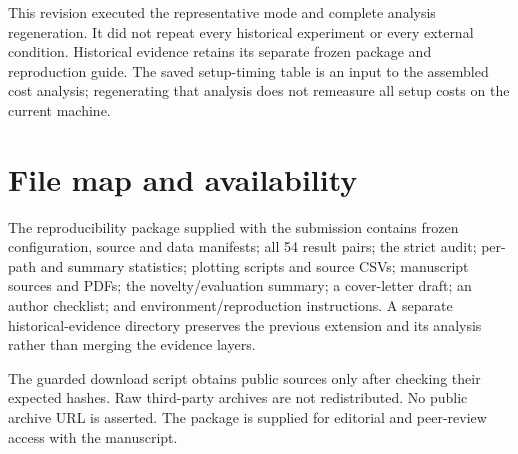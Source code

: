 \documentclass[smallextended]{svjour3}
\begin{document}
This revision executed the representative mode and complete analysis regeneration.
It did not repeat every historical experiment or every external condition.
Historical evidence retains its separate frozen package and reproduction guide.
The saved setup-timing table is an input to the assembled cost analysis; regenerating
that analysis does not remeasure all setup costs on the current machine.

\section{File map and availability}
The reproducibility package supplied with the submission contains frozen configuration, source and data manifests;
all 54 result pairs; the strict audit; per-path and summary statistics; plotting
scripts and source CSVs; manuscript sources and PDFs; the novelty/evaluation
summary; a cover-letter draft; an author checklist; and environment/reproduction
instructions. A separate historical-evidence directory preserves the previous
extension and its analysis rather than merging the evidence layers.

The guarded download script obtains public sources only after checking their
expected hashes. Raw third-party archives are not redistributed. No public
archive URL is asserted. The package is supplied for editorial and peer-review
access with the manuscript.
\end{document}
